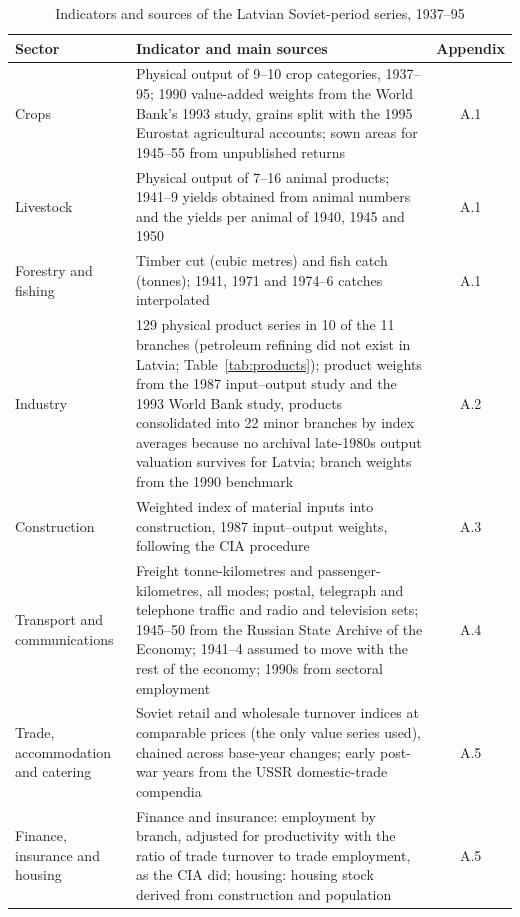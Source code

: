 \begin{table}[htbp]\centering\scriptsize\setlength{\tabcolsep}{3pt}
\caption{Indicators and sources of the Latvian Soviet-period series, 1937--95}
\label{tab:sources}
\begin{threeparttable}
\begin{tabular}{p{2.9cm}p{11.3cm}c}
\toprule
Sector & Indicator and main sources & Appendix \\
\midrule
Crops & Physical output of 9--10 crop categories, 1937--95; 1990 value-added weights from the World Bank's 1993 study, grains split with the 1995 Eurostat agricultural accounts; sown areas for 1945--55 from unpublished returns & A.1 \\
Livestock & Physical output of 7--16 animal products; 1941--9 yields obtained from animal numbers and the yields per animal of 1940, 1945 and 1950 & A.1 \\
Forestry and fishing & Timber cut (cubic metres) and fish catch (tonnes); 1941, 1971 and 1974--6 catches interpolated & A.1 \\
Industry & 129 physical product series in 10 of the 11 branches (petroleum refining did not exist in Latvia; Table~\ref{tab:products}); product weights from the 1987 input--output study and the 1993 World Bank study, products consolidated into 22 minor branches by index averages because no archival late-1980s output valuation survives for Latvia; branch weights from the 1990 benchmark & A.2 \\
Construction & Weighted index of material inputs into construction, 1987 input--output weights, following the CIA procedure & A.3 \\
Transport and communications & Freight tonne-kilometres and passenger-kilometres, all modes; postal, telegraph and telephone traffic and radio and television sets; 1945--50 from the Russian State Archive of the Economy; 1941--4 assumed to move with the rest of the economy; 1990s from sectoral employment & A.4 \\
Trade, accommodation and catering & Soviet retail and wholesale turnover indices at comparable prices (the only value series used), chained across base-year changes; early post-war years from the USSR domestic-trade compendia & A.5 \\
Finance, insurance and housing & Finance and insurance: employment by branch, adjusted for productivity with the ratio of trade turnover to trade employment, as the CIA did; housing: housing stock derived from construction and population & A.5 \\

\end{tabular}
\end{threeparttable}
\end{table}
